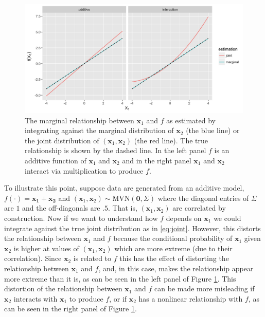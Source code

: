 \begin{figure}[h!]
  \includegraphics[width=\textwidth]{mvj.png}
  \caption{The marginal relationship between $\mathbf{x}_1$ and $f$ as estimated by integrating against the marginal distribution of $\mathbf{x}_2$ (the blue line) or the joint distribution of $(\mathbf{x}_1, \mathbf{x}_2)$ (the red line). The true relationship is shown by the dashed line. In the left panel $f$ is an additive function of $\mathbf{x}_1$ and $\mathbf{x}_2$ and in the right panel $\mathbf{x}_1$ and $\mathbf{x}_2$ interact via multiplication to produce $f$. \label{fig:sim}}
\end{figure}

To illustrate this point, suppose data are generated from an additive model, $f(\cdot) = \mathbf{\mathbf{x}_1} + \mathbf{\mathbf{x}_2}$ and $(\mathbf{x}_1, \mathbf{x}_2) \sim \text{MVN}(\mathbf{0}, \Sigma)$ where the diagonal entries of $\Sigma$ are $1$ and the off-diagonals are $.5$. That is, $(\mathbf{x}_1, \mathbf{x}_2)$ are correlated by construction. Now if we want to understand how $f$ depends on $\mathbf{x}_1$ we could integrate against the true joint distribution as in \ref{eq:joint}. However, this distorts the relationship between $\mathbf{x}_1$ and $f$ because the conditional probability of $\mathbf{x}_1$ given $\mathbf{x}_2$ is higher at values of $(\mathbf{x}_1, \mathbf{x}_2)$ which are more extreme (due to their correlation). Since $\mathbf{x}_2$ is related to $f$ this has the effect of distorting the relationship between $\mathbf{x}_1$ and $f$, and, in this case, makes the relationship appear more extreme than it is, as can be seen in the left panel of Figure \ref{fig:sim}. This distortion of the relationship between $\mathbf{x}_1$ and $f$ can be made more misleading if $\mathbf{x}_2$ interacts with $\mathbf{x}_1$ to produce $f$, or if $\mathbf{x}_2$ has a nonlinear relationship with $f$, as can be seen in the right panel of Figure \ref{fig:sim}.

